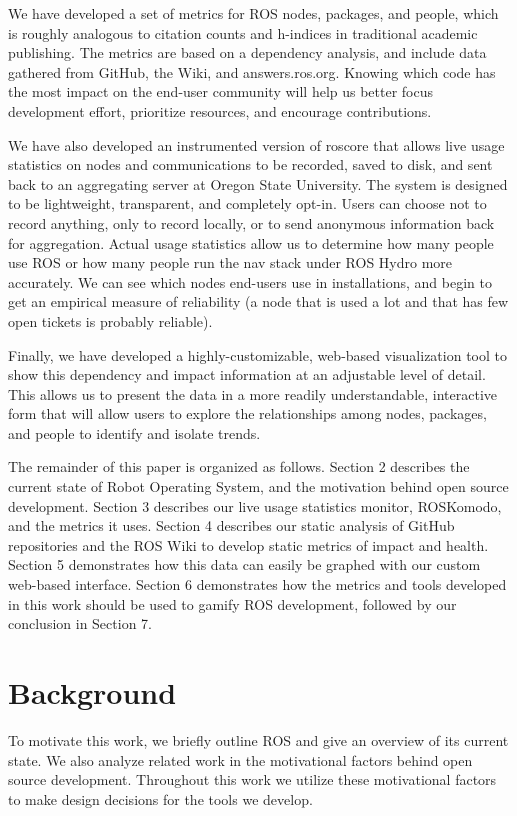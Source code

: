 \documentclass[letterpaper, 10 pt, conference]{ieeeconf}  %
\begin{document}
We have developed a set of metrics for ROS nodes, packages, and people, which is roughly analogous to citation counts and h-indices in traditional academic publishing. The metrics are based on a dependency analysis, and include data gathered from GitHub, the Wiki, and answers.ros.org. Knowing which code has the most impact on the end-user community will help us better focus development effort, prioritize resources, and encourage contributions.

We have also developed an instrumented version of roscore that allows live usage statistics on nodes and communications to be recorded, saved to disk, and sent back to an aggregating server at Oregon State University. The system is designed to be lightweight, transparent, and completely opt-in.  Users can choose not to record anything, only to record locally, or to send anonymous information back for aggregation. Actual usage statistics allow us to determine how many people use ROS or how many people run the nav stack under ROS Hydro more accurately. We can see which nodes end-users use in installations, and begin to get an empirical measure of reliability (a node that is used a lot and that has few open tickets is probably reliable).

Finally, we have developed a highly-customizable, web-based visualization tool to show this dependency and impact information at an adjustable level of detail. This allows us to present the data in a more readily understandable, interactive form that will allow users to explore the relationships among nodes, packages, and people to identify and isolate trends.

The remainder of this paper is organized as follows. Section 2 describes the current state of Robot Operating System, and the motivation behind open source development. Section 3 describes our live usage statistics monitor, ROSKomodo, and the metrics it uses. Section 4 describes our static analysis of GitHub repositories and the ROS Wiki to develop static metrics of impact and health. Section 5 demonstrates how this data can easily be graphed with our custom web-based interface. Section 6 demonstrates how the metrics and tools developed in this work should be used to gamify ROS development, followed by our conclusion in Section 7.
\section{Background}

To motivate this work, we briefly outline ROS and give an overview of its current state. We also analyze related work in the motivational factors behind open source development. Throughout this work we utilize these motivational factors to make design decisions for the tools we develop. 
\end{document}
